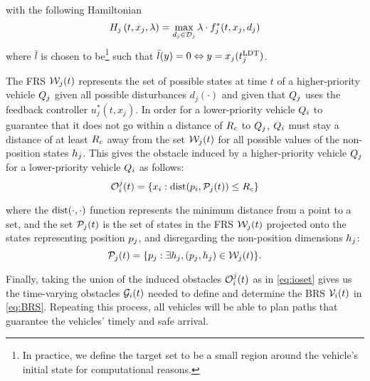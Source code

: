 \noindent with the following Hamiltonian
\begin{equation}
H_j\left(t, x_j, \lambda\right) = \max_{d_j \in \mathcal{D}_j} \lambda \cdot f^*_j(t, x_j, d_j)
\end{equation}
\noindent where $\bar l$ is chosen to be\footnote{In practice, we define the target set to be a small region around the vehicle's initial state for computational reasons.} such that $\bar l (y) = 0 \Leftrightarrow y = x_j(t^\text{LDT}_j)$.

The FRS $\mathcal{W}_j(t)$ represents the set of possible states at time $t$ of a higher-priority vehicle $Q_j$ given all possible disturbances $d_j(\cdot)$ and given that $Q_j$ uses the feedback controller $u_j^*(t, x_j)$. In order for a lower-priority vehicle $Q_i$ to guarantee that it does not go within a distance of $R_c$ to $Q_j$, $Q_i$ must stay a distance of at least $R_c$ away from the set $\mathcal{W}_j(t)$ for all possible values of the non-position states $h_j$. This gives the obstacle induced by a higher-priority vehicle $Q_j$ for a lower-priority vehicle $Q_i$ as follows:
\vspace{-0.4em}
\begin{equation} \label{eqn:ccObs}
\ioset_i^j(t) = \{x_i: \dist(\pos_i, \pfrs_j(t)) \le \cradius \}
\end{equation}

\noindent where the $\text{dist}(\cdot, \cdot)$ function represents the minimum distance from a point to a set, and the set $\mathcal{P}_j(t)$ is the set of states in the FRS $\mathcal{W}_j(t)$ projected onto the states representing position $p_j$, and disregarding the non-position dimensions $h_j$:
\vspace{-0.4em}
\begin{equation} \label{eqn:ccObs_help1}
\pfrs_j(t) = \{p_j: \exists \npos_j, (p_j, \npos_j) \in \frs_j(t)\}.
\end{equation}

Finally, taking the union of the induced obstacles $\mathcal{O}_i^j(t)$ as in \eqref{eq:ioset} gives us the time-varying obstacles $\mathcal{G}_i(t)$ needed to define and determine the BRS $\mathcal{V}_i(t)$ in \eqref{eq:BRS}. Repeating this process, all vehicles will be able to plan paths that guarantee the vehicles' timely and safe arrival.

